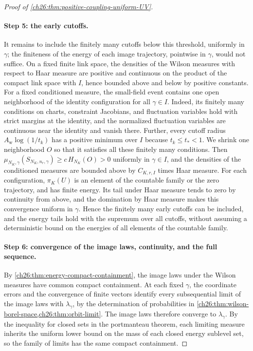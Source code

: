 \begin{proof}[Proof of \cref{ch26:thm:positive-coupling-uniform-UV}]
\paragraph{Step 5: the early cutoffs.}
It remains to include the finitely many cutoffs below this threshold, uniformly in $\gamma$; the finiteness of the energy of each image trajectory, pointwise in $\gamma$, would not suffice. On a fixed finite link space, the densities of the Wilson measures with respect to Haar measure are positive and continuous on the product of the compact link space with $I$, hence bounded above and below by positive constants. For a fixed conditioned measure, the small-field event contains one open neighborhood of the identity configuration for all $\gamma\in I$. Indeed, its finitely many conditions on charts, constraint Jacobians, and fluctuation variables hold with strict margins at the identity, and the normalized fluctuation variables are continuous near the identity and vanish there. Further, every cutoff radius $A_{\mathrm w}\log(1/t_k)$ has a positive minimum over $I$ because $t_k\le t_*<1$. We shrink one neighborhood $O$ so that it satisfies all these finitely many conditions. Then $\mu_{N_K,\gamma}(S_{N_K,n_r,\gamma})\ge c\,H_{N_K}(O)>0$ uniformly in $\gamma\in I$, and the densities of the conditioned measures are bounded above by $C_{K,r,I}$ times Haar measure. For each configuration, $\pi_K(U)$ is an element of the countable family or the zero trajectory, and has finite energy. Its tail under Haar measure tends to zero by continuity from above, and the domination by Haar measure makes this convergence uniform in $\gamma$. Hence the finitely many early cutoffs can be included, and the energy tails hold with the supremum over all cutoffs, without assuming a deterministic bound on the energies of all elements of the countable family.

\paragraph{Step 6: convergence of the image laws, continuity, and the full sequence.}
By \cref{ch26:thm:energy-compact-containment}, the image laws under the Wilson measures have common compact containment. At each fixed $\gamma$, the coordinate errors and the convergence of finite vectors identify every subsequential limit of the image laws with $\lambda_\gamma$, by the determination of probabilities in \cref{ch26:thm:wilson-borel-space,ch26:thm:orbit-limit}. The image laws therefore converge to $\lambda_\gamma$. By the inequality for closed sets in the portmanteau theorem, each limiting measure inherits the uniform lower bound on the mass of each closed energy sublevel set, so the family of limits has the same compact containment.


\end{proof}
